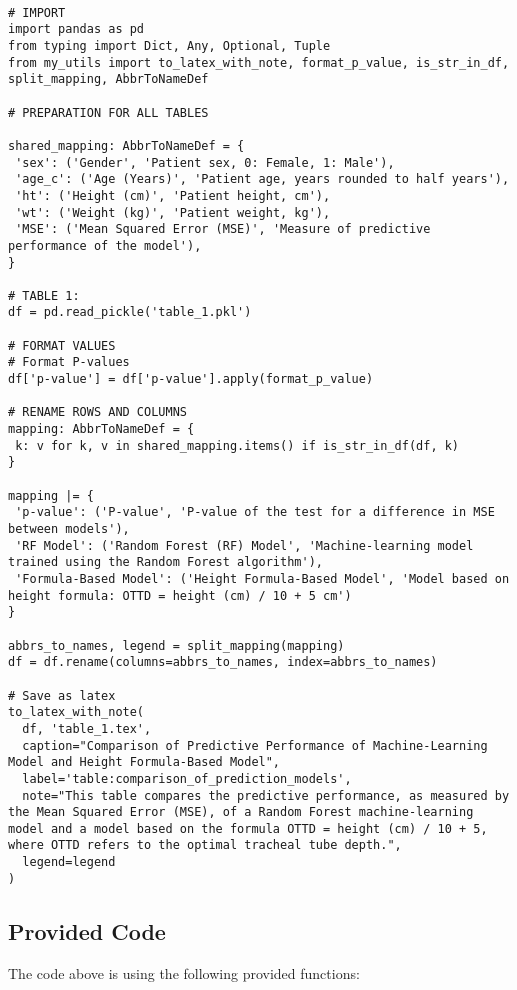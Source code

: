 \documentclass[11pt]{article}
\begin{document}
\begin{verbatim}

# IMPORT
import pandas as pd
from typing import Dict, Any, Optional, Tuple
from my_utils import to_latex_with_note, format_p_value, is_str_in_df, split_mapping, AbbrToNameDef

# PREPARATION FOR ALL TABLES

shared_mapping: AbbrToNameDef = {
 'sex': ('Gender', 'Patient sex, 0: Female, 1: Male'),
 'age_c': ('Age (Years)', 'Patient age, years rounded to half years'),
 'ht': ('Height (cm)', 'Patient height, cm'),
 'wt': ('Weight (kg)', 'Patient weight, kg'),
 'MSE': ('Mean Squared Error (MSE)', 'Measure of predictive performance of the model'),
}

# TABLE 1:
df = pd.read_pickle('table_1.pkl')

# FORMAT VALUES
# Format P-values
df['p-value'] = df['p-value'].apply(format_p_value)

# RENAME ROWS AND COLUMNS
mapping: AbbrToNameDef = {
 k: v for k, v in shared_mapping.items() if is_str_in_df(df, k)
}

mapping |= {
 'p-value': ('P-value', 'P-value of the test for a difference in MSE between models'),
 'RF Model': ('Random Forest (RF) Model', 'Machine-learning model trained using the Random Forest algorithm'),
 'Formula-Based Model': ('Height Formula-Based Model', 'Model based on height formula: OTTD = height (cm) / 10 + 5 cm')
}

abbrs_to_names, legend = split_mapping(mapping)
df = df.rename(columns=abbrs_to_names, index=abbrs_to_names)

# Save as latex
to_latex_with_note(
  df, 'table_1.tex',
  caption="Comparison of Predictive Performance of Machine-Learning Model and Height Formula-Based Model", 
  label='table:comparison_of_prediction_models',
  note="This table compares the predictive performance, as measured by the Mean Squared Error (MSE), of a Random Forest machine-learning model and a model based on the formula OTTD = height (cm) / 10 + 5, where OTTD refers to the optimal tracheal tube depth.", 
  legend=legend
)

\end{verbatim}

\subsection{Provided Code}
The code above is using the following provided functions:
\end{document}
